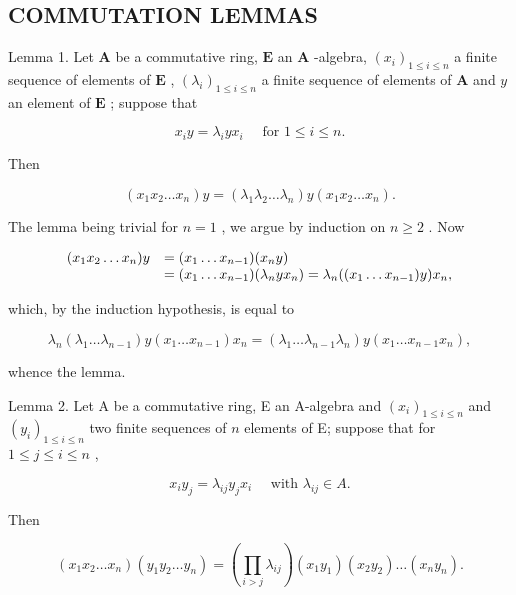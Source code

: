 \subsection{COMMUTATION LEMMAS}

Lemma 1. Let \(\mathbf{A}\) be a commutative ring, \(\mathbf{E}\) an \(\mathbf{A}\) -algebra, \((x_{i})_{1\leqslant i\leqslant n}\) a finite sequence of elements of \(\mathbf{E}\) , \((\lambda_i)_{1\leqslant i\leqslant n}\) a finite sequence of elements of \(\mathbf{A}\) and \(y\) an element of \(\mathbf{E}\) ; suppose that

\[
x _ {i} y = \lambda_ {i} y x _ {i} \quad \text { for } 1 \leqslant i \leqslant n.\tag{13}
\]

Then

\[
\left(x _ {1} x _ {2} \dots x _ {n}\right) y = \left(\lambda_ {1} \lambda_ {2} \dots \lambda_ {n}\right) y \left(x _ {1} x _ {2} \dots x _ {n}\right).\tag{14}
\]

The lemma being trivial for \(n = 1\) , we argue by induction on \(n \geqslant 2\) . Now

\[
\begin{array}{r l} (x _ {1} x _ {2} \dots x _ {n}) y & = (x _ {1} \dots x _ {n - 1}) (x _ {n} y) \\ & = (x _ {1} \dots x _ {n - 1}) (\lambda_ {n} y x _ {n}) = \lambda_ {n} ((x _ {1} \dots x _ {n - 1}) y) x _ {n}, \end{array}
\]

which, by the induction hypothesis, is equal to

\[
\lambda_ {n} \left(\lambda_ {1} \dots \lambda_ {n - 1}\right) y \left(x _ {1} \dots x _ {n - 1}\right) x _ {n} = \left(\lambda_ {1} \dots \lambda_ {n - 1} \lambda_ {n}\right) y \left(x _ {1} \dots x _ {n - 1} x _ {n}\right),
\]

whence the lemma.

Lemma 2. Let A be a commutative ring, E an A-algebra and \((x_{i})_{1\leqslant i\leqslant n}\) and \((y_{i})_{1\leqslant i\leqslant n}\) two finite sequences of \(n\) elements of E; suppose that for \(1\leqslant j\leqslant i\leqslant n\) ,

\[
x _ {i} y _ {j} = \lambda_ {i j} y _ {j} x _ {i} \quad \text { with } \lambda_ {i j} \in A.\tag{15}
\]

Then

\[
\left(x _ {1} x _ {2} \dots x _ {n}\right) \left(y _ {1} y _ {2} \dots y _ {n}\right) = \left(\prod_ {i > j} \lambda_ {i j}\right) \left(x _ {1} y _ {1}\right) \left(x _ {2} y _ {2}\right) \dots \left(x _ {n} y _ {n}\right).\tag{16}
\]

